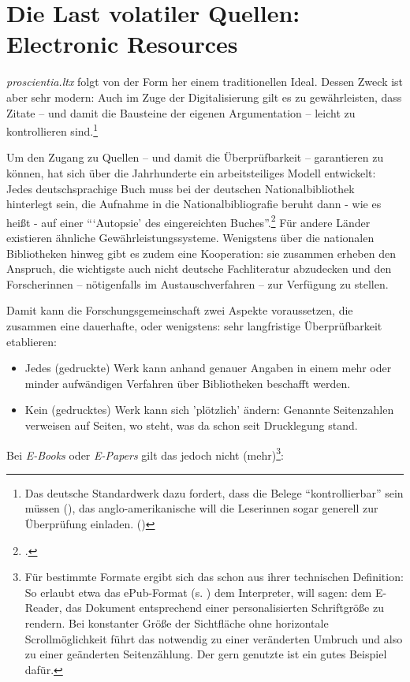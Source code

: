 \appendix
\section{Die Last volatiler Quellen: Electronic Resources}

\emph{proscientia.ltx} folgt von der Form her einem traditionellen Ideal. Dessen Zweck ist aber sehr modern: Auch im Zuge der Digitalisierung gilt es zu gewährleisten, dass Zitate -- und damit die Bausteine der eigenen Argumentation -- leicht zu kontrollieren sind.\footnote{Das deutsche Standardwerk dazu fordert, dass die Belege \enquote{kontrollierbar} sein müssen (\cite[vgl.][160]{Theisen2013a}), das anglo-amerikanische will die Leserinnen sogar generell zur Überprüfung einladen. (\cite[vgl.][52]{ModLanAss2009a})}

Um den Zugang zu Quellen -- und damit die Überprüfbarkeit -- garantieren zu können, hat sich über die Jahrhunderte ein arbeitsteiliges Modell entwickelt: Jedes deutschsprachige Buch muss bei der deutschen Nationalbibliothek hinterlegt sein, die Aufnahme in die Nationalbibliografie beruht dann - wie es heißt - auf einer \enquote{\enquote{Autopsie} des eingereichten Buches}.\footcite[vgl.][68]{Theisen2013a} Für andere Länder existieren ähnliche Gewährleistungssysteme. Wenigstens über die nationalen Bibliotheken hinweg gibt es zudem eine Kooperation: sie zusammen erheben den Anspruch, die wichtigste auch nicht deutsche Fachliteratur abzudecken und den Forscherinnen -- nötigenfalls im Austauschverfahren -- zur Verfügung zu stellen.

Damit kann die Forschungsgemeinschaft zwei Aspekte voraussetzen, die zusammen eine dauerhafte, oder wenigstens: sehr langfristige Überprüfbarkeit etablieren:

\begin{itemize}
  \item Jedes (gedruckte) Werk kann anhand genauer Angaben in einem mehr oder minder aufwändigen Verfahren über Bibliotheken beschafft werden.
  \item  Kein (gedrucktes) Werk kann sich 'plötzlich' ändern: Genannte Seitenzahlen verweisen auf Seiten, wo steht, was da schon seit Drucklegung stand.
\end{itemize}

Bei \emph{E-Books} oder \emph{E-Papers} gilt das jedoch nicht (mehr)\footnote{Für bestimmte Formate ergibt sich das schon aus ihrer technischen Definition: So erlaubt etwa das ePub-Format (s. ) dem Interpreter, will sagen: dem E-Reader, das Dokument entsprechend einer personalisierten Schriftgröße zu rendern. Bei konstanter Größe der Sichtfläche ohne horizontale Scrollmöglichkeit führt das notwendig zu einer veränderten Umbruch und also zu einer geänderten Seitenzählung. Der gern genutzte  ist ein gutes Beispiel dafür.}:

